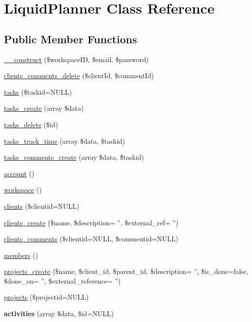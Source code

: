 \hypertarget{classLiquidPlanner}{\section{\-Liquid\-Planner \-Class \-Reference}
\label{classLiquidPlanner}
}
\subsection*{\-Public \-Member \-Functions}
\begin{DoxyCompactItemize}
\item 
\hyperlink{classLiquidPlanner_a0d0abee95b7d095d88f080a1f5debcd1}{\-\_\-\-\_\-construct} (\$workspace\-I\-D, \$email, \$password)
\item 
\hyperlink{classLiquidPlanner_a20fb803d7667ba23515ac730b57d3be9}{clients\-\_\-comments\-\_\-delete} (\$client\-Id, \$comment\-Id)
\item 
\hyperlink{classLiquidPlanner_a058203506b65fab8abc2691d4a73bcb6}{tasks} (\$taskid=\-N\-U\-L\-L)
\item 
\hyperlink{classLiquidPlanner_a91a8d60f702c9b774e292c734df4f47f}{tasks\-\_\-create} (array \$data)
\item 
\hyperlink{classLiquidPlanner_adb51bedafa48a1945b20a3a546521bb5}{tasks\-\_\-delete} (\$id)
\item 
\hyperlink{classLiquidPlanner_afaddde49d5ccb8388bc811cbd24bafd9}{tasks\-\_\-track\-\_\-time} (array \$data, \$taskid)
\item 
\hyperlink{classLiquidPlanner_a231945dadafba5268ec7b1a4305a650b}{tasks\-\_\-comments\-\_\-create} (array \$data, \$taskid)
\item 
\hyperlink{classLiquidPlanner_ad17b0c0897ccfd57b3711f575c71ac52}{account} ()
\item 
\hyperlink{classLiquidPlanner_a578c0b5f4bebd4b6d5bd9fa4094f47ef}{workspace} ()
\item 
\hyperlink{classLiquidPlanner_ad24127489529c593f1ce237754a47861}{clients} (\$clientid=\-N\-U\-L\-L)
\item 
\hyperlink{classLiquidPlanner_a92c8865b143ee7a75c315a0b0d3ed5bd}{clients\-\_\-create} (\$name, \$description= '', \$external\-\_\-ref= '')
\item 
\hyperlink{classLiquidPlanner_ab285c107c686d95f320b1136a37ce9e5}{clients\-\_\-comments} (\$clientid=\-N\-U\-L\-L, \$commentid=\-N\-U\-L\-L)
\item 
\hyperlink{classLiquidPlanner_a4949a453567ac21183db806e626beb48}{members} ()
\item 
\hyperlink{classLiquidPlanner_a16bef00a1fb8c0fa59581925dce9aeb0}{projects\-\_\-create} (\$name, \$client\-\_\-id, \$parent\-\_\-id, \$description= '', \$is\-\_\-done=false, \$done\-\_\-on= '', \$external\-\_\-reference= '')
\item 
\hyperlink{classLiquidPlanner_a4db0ff8eca9cdb5dc17cb09ffae056b2}{projects} (\$projectid=\-N\-U\-L\-L)
\item 
\hypertarget{classLiquidPlanner_acac28a1520fd8b2111c9c972976f5a15}{{\bfseries activities} (array \$data, \$id=\-N\-U\-L\-L)}\label{classLiquidPlanner_acac28a1520fd8b2111c9c972976f5a15}


\end{DoxyCompactItemize}

